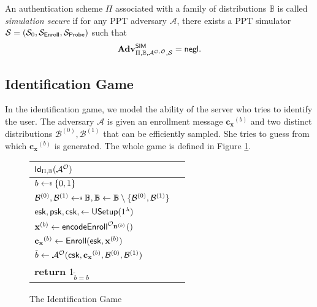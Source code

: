 An authentication scheme $\Pi$ associated with a family of distributions $\mathbb{B}$ is called \emph{simulation secure} if for any PPT adversary $\mathcal{A}$, there exists a PPT simulator $\mathcal{S} = (\mathcal{S}_0, \mathcal{S}_{\sf Enroll}, \mathcal{S}_{\sf Probe})$ such that
\[
	\mathbf{Adv}^{\sf SIM}_{\Pi, \mathbb{B}, \mathcal{A}^{\mathcal{O}, \tilde{\mathcal{O}}}, \mathcal{S}} = \mathsf{negl}.
\]


\subsection{Identification Game}
\label{sec:id_game}

In the identification game, we model the ability of the server who tries to identify the user. The adversary $\mathcal{A}$ is given an enrollment message $\mathbf{c_x}^{(b)}$ and two distinct distributions $\mathcal{B}^{(0)}, \mathcal{B}^{(1)}$ that can be efficiently sampled. She tries to guess from which $\mathbf{c_x}^{(b)}$ is generated. The whole game is defined in Figure \ref{fig:id_game}.

\begin{figure}[h]
	\begin{center}
	\begin{tabular}{l c}
		${\sf Id}_{\Pi, \mathbb{B}}(\mathcal{A}^\mathcal{O})$\\

			\hline

			$b \getsdollar \{0, 1\}$ \\

			$\mathcal{B}^{(0)}, \mathcal{B}^{(1)} \getsdollar \mathbb{B}, \mathbb{B} \gets \mathbb{B} \setminus \{ \mathcal{B}^{(0)}, \mathcal{B}^{(1)} \}$ \\

			${\sf esk}, {\sf psk}, {\sf csk}, \gets {\sf USetup}(1^\lambda)$ \\

			$\mathbf{x}^{(b)} \gets {\sf encodeEnroll}^{\mathcal{O}_{\mathbf{B}^{(b)}}}()$ \\

			$\mathbf{c_x}^{(b)} \gets {\sf Enroll}({\sf esk}, \mathbf{x}^{(b)})$ \\

			$\tilde{b} \gets \mathcal{A}^{\mathcal{O}} ( {\sf csk}, \mathbf{c_x}^{(b)}, \mathcal{B}^{(0)}, \mathcal{B}^{(1)} )$ \\

			\textbf{return} $1_{\tilde{b} = b}$
			
	\end{tabular}
	\end{center}
	\caption{The Identification Game}
	\label{fig:id_game}
\end{figure}


